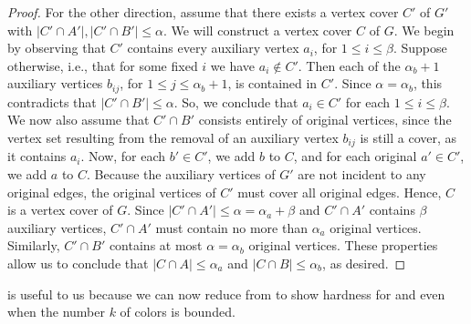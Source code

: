 \begin{proof}
    For the other direction, assume that there exists a vertex cover $C'$ of $G'$ with $|C' \cap A'|, |C' \cap B'| \leq \alpha$.
    We will construct a vertex cover $C$ of $G$.
    We begin by observing that $C'$ contains every auxiliary vertex $a_i$, for $1 \leq i \leq \beta$.
    Suppose otherwise, i.e., that for some fixed $i$ we have $a_i \notin C'$. Then each of the $\alpha_b + 1$ auxiliary vertices $b_{ij}$, for $1 \leq j \leq \alpha_b + 1$, is contained in $C'$.
    Since $\alpha = \alpha_b$, this contradicts that $|C' \cap B'| \leq \alpha$. So, we conclude that $a_i \in C'$ for each $1 \leq i \leq \beta$.
    We now also assume that $C' \cap B'$ consists entirely of original vertices, since the vertex set resulting from the removal of an auxiliary vertex $b_{ij}$ is still a cover, as it contains $a_i$.
    Now, for each $b' \in C'$, we add $b$ to $C$, and for each original $a' \in C'$, we add $a$ to $C$. Because the auxiliary vertices of $G'$ are not incident to any original edges, the original vertices of $C'$ must cover
    all original edges. Hence, $C$ is a vertex cover of $G$. Since $|C' \cap A'| \leq \alpha = \alpha_a + \beta$ and $C' \cap A'$ contains $\beta$ auxiliary vertices, $C' \cap A'$ must contain no more than $\alpha_a$ original vertices.
    Similarly, $C' \cap B'$ contains at most $\alpha = \alpha_b$ original vertices.
    These properties allow us to conclude that $|C \cap A| \leq \alpha_a$ and $|C \cap B| \leq \alpha_b$, as desired.
\end{proof}
%
 is useful to us because we can now reduce from \fairbipartiteVC{} to show hardness for \cfminECC{} and \cfmaxECC{} even when the number $k$ of colors is bounded.

